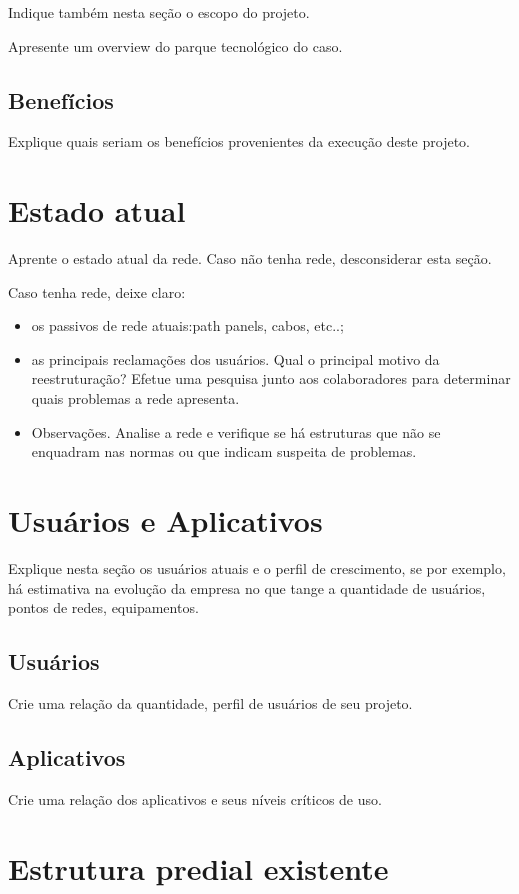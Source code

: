 \documentclass[	DIV=calc,%
							paper=a4,%
							fontsize=12pt,%
							onecolumn]{scrartcl}	 					%
\begin{document}
Indique também nesta seção o escopo do projeto.

Apresente um overview do parque tecnológico do caso.
\subsection{Benefícios}
Explique quais seriam os benefícios provenientes da execução deste projeto.


\section{Estado atual}
Aprente o estado atual da rede. Caso não tenha rede, desconsiderar esta seção.

Caso tenha rede, deixe claro:
\begin{itemize}
	\item os passivos de rede atuais:path panels, cabos, etc..;
	\item as principais reclamações dos usuários. Qual o principal motivo da reestruturação? Efetue uma pesquisa junto aos colaboradores para determinar quais problemas a rede apresenta.
	\item Observações. Analise a rede e verifique se há estruturas que não se enquadram nas normas ou que indicam suspeita de problemas.
\end{itemize}


\section{Usuários e Aplicativos}
Explique nesta seção os usuários atuais e o perfil de crescimento, se por exemplo, há estimativa na evolução da empresa no que tange a quantidade de usuários, pontos de redes, equipamentos.
 

\subsection{Usuários}
Crie uma relação da quantidade, perfil de usuários de seu projeto.

\subsection{Aplicativos}
Crie uma relação dos aplicativos e seus níveis críticos de uso.


\section{Estrutura predial existente}
\end{document}
